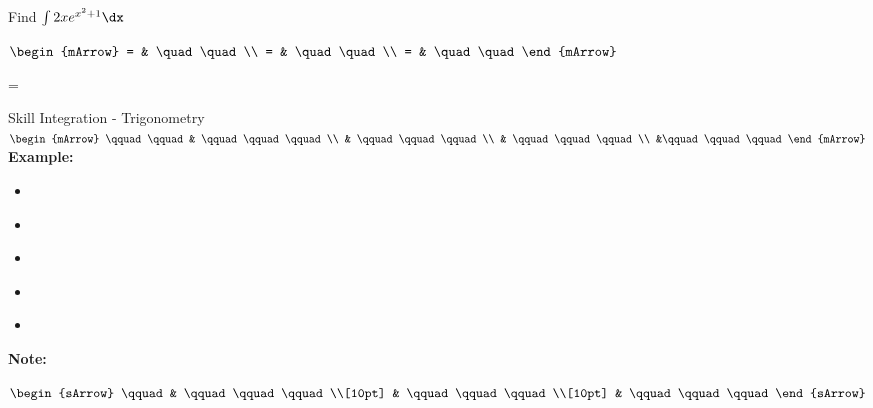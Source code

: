 \begin{mtask}[resume]
   \task \begin{exercise} Find $\int 2x e^{x^2+1} \dx$
           \begin{envSolution}
             $\begin{mArrow}
                 = & \quad \quad              \\
		   		 = & \quad \quad              \\
				 = & \quad \quad 
              \end{mArrow}$
            \begin{shortsolution}  
			     =$ \quad \quad \quad \quad$
			\end{shortsolution}				 
           \end{envSolution}
         \end{exercise}
\end{mtask}



\clearpage
{}
\begin{boxSkill}{Skill \thenskill \quad Integration - Trigonometry}
    \noindent%
	 $\begin{mArrow}
        \qquad \qquad &    \qquad\qquad\qquad          \\
                      & \qquad\qquad\qquad \\
			          & \qquad\qquad\qquad  \\
			          &\qquad\qquad\qquad
 	 \end{mArrow}$\\[0.5cm]
	 

	\textbf{Example:}
	\begin{itemize}[leftmargin=0.8cm]
	     \item[] $\qquad\qquad\qquad    $
	     \item[] $\qquad\qquad\qquad     $
	     \item[] $\qquad\qquad\qquad      $ 
	     \item[] $\qquad\qquad\qquad    $
	     \item[] $\qquad\qquad\qquad  $	 
	\end{itemize}
	
	\tcbline
	
    \textbf{Note:}\\[0.6cm]
	\begin{warningEnv}
	    $\begin{sArrow}
	        \qquad   & \qquad\qquad\qquad \\[10pt]
	  	             & \qquad\qquad\qquad                                                                        \\[10pt] 
                     & \qquad\qquad\qquad 				   
		 \end{sArrow}$		   
    \end{warningEnv}
\end{boxSkill}


